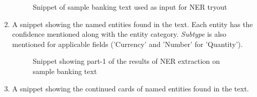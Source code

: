 \begin{enumerate}
\begin {figure}[h!h]
            \caption{Snippet of sample banking text used as input for \acs{NER} tryout}
            \label{nertryout}
        \end {figure}
    \clearpage
    \newpage
    \item A snippet showing the named entities found in the text. Each entity has the confidence mentioned along with the entity category. \textit{Subtype} is also mentioned for applicable fields ('Currency' and 'Number' for 'Quantity').
        \begin {figure}[h!h]
            \centering
            \caption{Snippet showing part-1 of the results of NER extraction on sample banking text}
            \label{nerres1}
        \end {figure}
    \item A snippet showing the continued cards of named entities found in the text. 
    \begin {figure}[h!h]
        \centering

\end{figure}
\end{enumerate}
